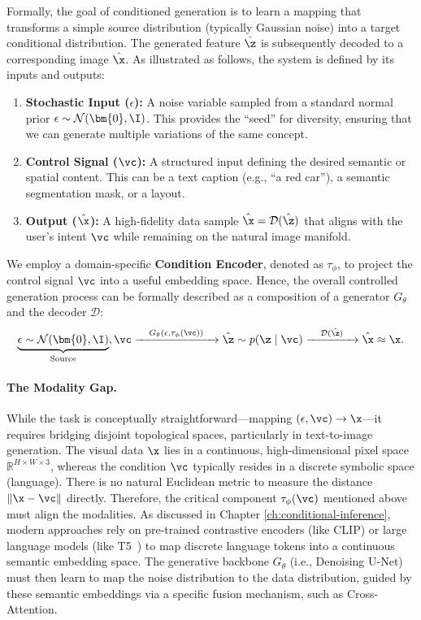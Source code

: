 \documentclass[../../book-main.tex]{subfiles}
\begin{document}
Formally, the goal of conditioned generation is to learn a mapping
that transforms a simple source distribution (typically Gaussian
noise) into a target conditional distribution. The generated feature
$\hat{\z}$ is subsequently decoded to a corresponding image
$\hat{\x}$. As illustrated as follows, the system is defined by its
inputs and outputs:
\begin{enumerate}
\item \textbf{Stochastic Input ($\epsilon$):} A noise variable
    sampled from a standard normal prior $\epsilon \sim
    \mathcal{N}(\bm{0}, \I)$. This provides the ``seed'' for
    diversity, ensuring that we can generate multiple variations of
    the same concept.
\item \textbf{Control Signal ($\vc$):} A structured input defining
    the desired semantic or spatial content. This can be a text
    caption (e.g., ``a red car''), a semantic segmentation mask, or a layout.
\item \textbf{Output ($\hat{\x}$):} A high-fidelity data sample
    $\hat{\x} = \mathcal{D}(\hat{\z})$ that aligns with the user's
    intent $\vc$ while remaining on the natural image manifold.
\end{enumerate}
We employ a domain-specific \textbf{Condition Encoder}, denoted as
$\tau_\phi$, to project the control signal $\vc$ into a useful
embedding space. Hence, the overall controlled generation process can
be formally described as a composition of a generator $G_\theta$ and
the decoder $\mathcal{D}$:
\begin{equation}
\underbrace{\epsilon \sim \mathcal{N}(\bm{0}, \I)}_{\text{Source}}, \vc
\xrightarrow{\quad G_\theta(\epsilon, \tau_\phi(\vc)) \quad}
\hat{\z} \sim p(\z\mid \vc)
\xrightarrow{\quad \mathcal{D}(\hat{\z}) \quad}
\hat{\x} \approx \x.
\end{equation}

\paragraph{The Modality Gap.}
While the task is conceptually straightforward—mapping $(\epsilon,
\vc) \to \x$—it requires bridging disjoint topological spaces,
particularly in text-to-image generation. The visual data $\x$ lies
in a continuous, high-dimensional pixel space $\mathbb{R}^{H \times W
\times 3}$, whereas the condition $\vc$ typically resides in a
discrete symbolic space (language). There is no natural Euclidean
metric to measure the distance $\| \x - \vc \|$ directly.
Therefore, the critical component $\tau_\phi(\vc)$ mentioned above
must align the modalities. As discussed in Chapter
\ref{ch:conditional-inference}, modern approaches rely on pre-trained
contrastive encoders (like CLIP) or large language models (like
T5~\citep{raffel2020exploring}) to map discrete language tokens into
a continuous semantic embedding space. The generative backbone
$G_\theta$ (i.e., Denoising U-Net) must then learn to map the noise
distribution to the data distribution, guided by these semantic
embeddings via a specific fusion mechanism, such as Cross-Attention.
\end{document}
